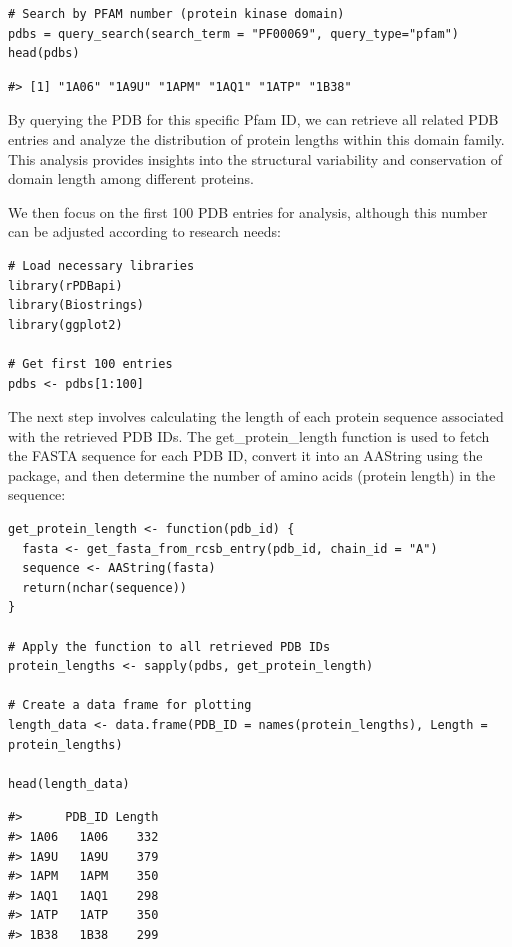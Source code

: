 \begin{verbatim}
# Search by PFAM number (protein kinase domain)
pdbs = query_search(search_term = "PF00069", query_type="pfam")  
head(pdbs)
\end{verbatim}

\begin{verbatim}
#> [1] "1A06" "1A9U" "1APM" "1AQ1" "1ATP" "1B38"
\end{verbatim}

By querying the PDB for this specific Pfam ID, we can retrieve all related PDB entries and analyze the distribution of protein lengths within this domain family. This analysis provides insights into the structural variability and conservation of domain length among different proteins.

We then focus on the first 100 PDB entries for analysis, although this number can be adjusted according to research needs:

\begin{verbatim}
# Load necessary libraries
library(rPDBapi)
library(Biostrings)
library(ggplot2)

# Get first 100 entries
pdbs <- pdbs[1:100]
\end{verbatim}

The next step involves calculating the length of each protein sequence associated with the retrieved PDB IDs. The get\_protein\_length function is used to fetch the FASTA sequence for each PDB ID, convert it into an AAString using the  package, and then determine the number of amino acids (protein length) in the sequence:

\begin{verbatim}
get_protein_length <- function(pdb_id) {
  fasta <- get_fasta_from_rcsb_entry(pdb_id, chain_id = "A")
  sequence <- AAString(fasta)
  return(nchar(sequence))
}

# Apply the function to all retrieved PDB IDs
protein_lengths <- sapply(pdbs, get_protein_length)

# Create a data frame for plotting
length_data <- data.frame(PDB_ID = names(protein_lengths), Length = protein_lengths)

head(length_data)
\end{verbatim}

\begin{verbatim}
#>      PDB_ID Length
#> 1A06   1A06    332
#> 1A9U   1A9U    379
#> 1APM   1APM    350
#> 1AQ1   1AQ1    298
#> 1ATP   1ATP    350
#> 1B38   1B38    299
\end{verbatim}

